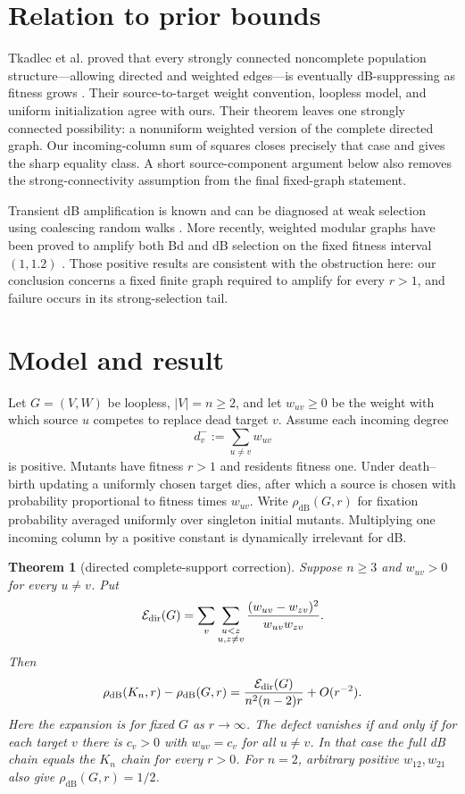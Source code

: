 \documentclass[11pt]{article}
\newtheorem{theorem}{Theorem}
\newcommand{\dB}{\mathrm{dB}}
\begin{document}
\section{Relation to prior bounds}

Tkadlec et al. proved that every strongly connected noncomplete population
structure---allowing directed and weighted edges---is eventually
dB-suppressing as fitness grows \cite{Tkadlec2020}.  Their source-to-target
weight convention, loopless model, and uniform initialization agree with ours.
Their theorem leaves one strongly connected possibility: a nonuniform weighted
version of the complete directed graph.  Our incoming-column sum of squares
closes precisely that case and gives the sharp equality class.  A short
source-component argument below also removes the strong-connectivity
assumption from the final fixed-graph statement.

Transient dB amplification is known and can be diagnosed at weak selection
using coalescing random walks \cite{Allen2020}.  More recently, weighted modular
graphs have been proved to amplify both Bd and dB selection on the fixed fitness
interval $(1,1.2)$ \cite{Svoboda2024}.  Those positive results are consistent
with the obstruction here: our conclusion concerns a fixed finite graph
required to amplify for every $r>1$, and failure occurs in its
strong-selection tail.

\section{Model and result}

Let $G=(V,W)$ be loopless, $|V|=n\ge2$, and let $w_{uv}\ge0$ be the
weight with which source $u$ competes to replace dead target $v$.  Assume each
incoming degree
\[
 d_v^-:=\sum_{u\ne v}w_{uv}
\]
is positive.  Mutants have fitness $r>1$ and residents fitness one.  Under
death--birth updating a uniformly chosen target dies, after which a source is
chosen with probability proportional to fitness times $w_{uv}$.  Write
$\rho_{\dB}(G,r)$ for fixation probability averaged uniformly over singleton
initial mutants.  Multiplying one incoming column by a positive constant is
dynamically irrelevant for dB.

\begin{theorem}[directed complete-support correction]\label{thm:main}
Suppose $n\ge3$ and $w_{uv}>0$ for every $u\ne v$.  Put
\[
 \mathcal E_{\rm dir}(G)=
 \sum_v\sum_{\substack{u<z\\u,z\ne v}}
 \frac{(w_{uv}-w_{zv})^2}{w_{uv}w_{zv}}.
\]
Then
\[
 \rho_{\dB}(K_n,r)-\rho_{\dB}(G,r)
 =\frac{\mathcal E_{\rm dir}(G)}{n^2(n-2)r}+O(r^{-2}).
\]
Here the expansion is for fixed $G$ as $r\to\infty$.
The defect vanishes if and only if for each target $v$ there is $c_v>0$ with
$w_{uv}=c_v$ for all $u\ne v$.  In that case the full dB chain equals the
$K_n$ chain for every $r>0$.  For $n=2$, arbitrary positive $w_{12},w_{21}$
also give $\rho_{\dB}(G,r)=1/2$.
\end{theorem}
\end{document}
